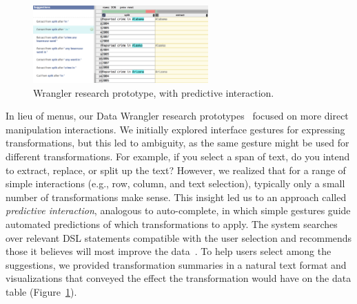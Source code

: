 \documentclass[11pt]{article}
\begin{document}
\begin{figure}
        \includegraphics[width=0.6\textwidth]{figs/wrangler.png}
        \caption{Wrangler research prototype, with predictive interaction.}
          \label{fig:wrangler}
\end{figure}
In lieu of menus, our Data Wrangler research prototypes~\cite{wrangler, proactive-wrangler} focused on more direct manipulation interactions. We initially explored interface gestures for expressing transformations, but this led to ambiguity, as the same gesture might be used for different transformations. For example, if you select a span of text, do you intend to extract, replace, or split up the text? However, we realized that for a range of simple interactions (e.g., row, column, and text selection), typically only a small number of transformations make sense. This insight led us to an approach called \emph{predictive interaction}, analogous to auto-complete, in which simple gestures guide automated predictions of which transformations to apply. The system searches over relevant DSL statements compatible with the user selection and recommends those it believes will most improve the data~\cite{cidr-pi}. To help users select among the suggestions, we provided transformation summaries in a natural text format and visualizations that conveyed the effect the transformation would have on the data table (Figure~\ref{fig:wrangler}).
\end{document}
